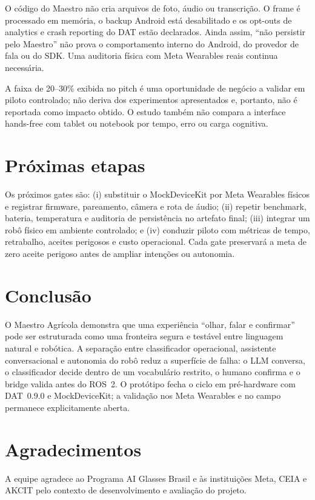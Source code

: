 \documentclass[conference]{IEEEtran}
\begin{document}
O código do Maestro não cria arquivos de foto, áudio ou transcrição. O frame é processado em memória, o backup Android está desabilitado e os opt-outs de analytics e crash reporting do DAT estão declarados. Ainda assim, “não persistir pelo Maestro” não prova o comportamento interno do Android, do provedor de fala ou do SDK. Uma auditoria física com Meta Wearables reais continua necessária.

A faixa de 20--30\% exibida no pitch é uma oportunidade de negócio a validar em piloto controlado; não deriva dos experimentos apresentados e, portanto, não é reportada como impacto obtido. O estudo também não compara a interface hands-free com tablet ou notebook por tempo, erro ou carga cognitiva.

\section{Próximas etapas}

Os próximos gates são: (i) substituir o MockDeviceKit por Meta Wearables físicos e registrar firmware, pareamento, câmera e rota de áudio; (ii) repetir benchmark, bateria, temperatura e auditoria de persistência no artefato final; (iii) integrar um robô físico em ambiente controlado; e (iv) conduzir piloto com métricas de tempo, retrabalho, aceites perigosos e custo operacional. Cada gate preservará a meta de zero aceite perigoso antes de ampliar intenções ou autonomia.

\section{Conclusão}

O Maestro Agrícola demonstra que uma experiência “olhar, falar e confirmar” pode ser estruturada como uma fronteira segura e testável entre linguagem natural e robótica. A separação entre classificador operacional, assistente conversacional e autonomia do robô reduz a superfície de falha: o LLM conversa, o classificador decide dentro de um vocabulário restrito, o humano confirma e o bridge valida antes do ROS~2. O protótipo fecha o ciclo em pré-hardware com DAT~0.9.0 e MockDeviceKit; a validação nos Meta Wearables e no campo permanece explicitamente aberta.

\section*{Agradecimentos}

A equipe agradece ao Programa AI Glasses Brasil e às instituições Meta, CEIA e AKCIT pelo contexto de desenvolvimento e avaliação do projeto.



\end{document}
